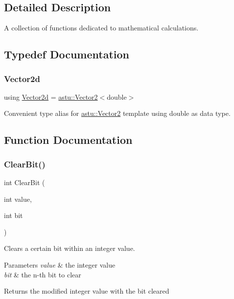 \subsection{Detailed Description}
A collection of functions dedicated to mathematical calculations. 



\subsection{Typedef Documentation}
\mbox{\label{group__math__group_ga04b5b280f94e1b680b1c831c1df168bd}} 
\subsubsection{\texorpdfstring{Vector2d}{Vector2d}}
{\footnotesize\ttfamily using \hyperlink{group__math__group_ga04b5b280f94e1b680b1c831c1df168bd}{Vector2d} =  \hyperlink{classastu_1_1Vector2}{astu\+::\+Vector2}$<$double$>$}

Convenient type alias for \hyperlink{classastu_1_1Vector2}{astu\+::\+Vector2} template using double as data type. 

\subsection{Function Documentation}
\mbox{\label{group__math__group_ga4ce9c5e2cee3bf609fcfba01c0f8e6a7}} 
\subsubsection{\texorpdfstring{Clear\+Bit()}{ClearBit()}}
{\footnotesize\ttfamily int Clear\+Bit (\begin{DoxyParamCaption}\item[{int}]{value,  }\item[{int}]{bit }\end{DoxyParamCaption})}

Clears a certain bit within an integer value.


\begin{DoxyParams}{Parameters}
{\em value} & the integer value \\
\hline
{\em bit} & the n-\/th bit to clear \\
\hline
\end{DoxyParams}
\begin{DoxyReturn}{Returns}
the modified integer value with the bit cleared 
\end{DoxyReturn}
\mbox{\label{group__math__group_ga298f9ccec14d3ea06c05ccd1e1e062ac}} 
